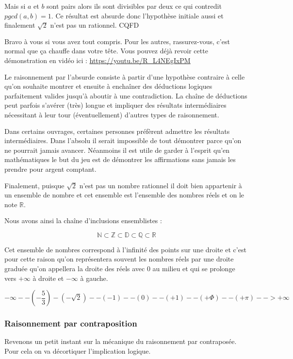 \documentclass[a4paper, 11pt, twoside]{article}
\newcommand{\R}{\mathbb{R}}
\newcommand{\E}[1]{\mathbb{#1}}
\begin{document}
Mais si \(a\) et \(b\) sont pairs alors ils sont divisibles par deux ce
qui contredit \(pgcd(a, b) = 1\). Ce résultat est absurde donc
l'hypothèse initiale aussi et finalement \(\sqrt{2}\) n'est pas un
rationnel. CQFD

Bravo à vous si vous avez tout compris. Pour les autres,
rassurez-vous, c'est normal que ça chauffe dans votre tête. Vous
pouvez déjà revoir cette démonstration en vidéo ici :
\url{https://youtu.be/R\_L4NEgIxPM}

Le raisonnement par l'absurde consiste à partir d'une hypothèse
contraire à celle qu'on souhaite montrer et ensuite à enchaîner des
déductions logiques parfaitement valides jusqu'à aboutir à une
contradiction. La chaîne de déductions peut parfois s'avérer (très)
longue et impliquer des résultats intermédiaires nécessitant à leur
tour (éventuellement) d'autres types de raisonnement.

Dans certains ouvrages, certaines personnes préfèrent admettre les
résultats intermédiaires. Dans l'absolu il serait impossible de
tout démontrer parce qu'on ne pourrait jamais avancer. Néanmoins il
est utile de garder à l'esprit qu'en mathématiques le but du jeu
est de démontrer les affirmations sans jamais les prendre pour
argent comptant.

Finalement, puisque \(\sqrt{2}\) n'est pas un nombre rationnel il
doit bien appartenir à un ensemble de nombre et cet ensemble est
l'ensemble des nombres réels et on le note \(\R\).

Nous avons ainsi la chaîne d'inclusions ensemblistes :

\[\E{N}\subset\E{Z}\subset\E{D}\subset\E{Q}\subset\R\]

Cet ensemble de nombres correspond à l'infinité des points sur une
droite et c'est pour cette raison qu'on représentera souvent les
nombres réels par une droite graduée qu'on appellera la droite des
réels avec 0 au milieu et qui se prolonge vers \(+\infty\) à droite
et \(-\infty\) à gauche.

\[-\infty --\left(-\frac{5}{3}\right)-(-\sqrt{2})--(-1)--(0)--(+1)--(+\Phi)--(+\pi)-->+\infty\]

\subsubsection{Raisonnement par contraposition}
\label{sec:org94fd512}

Revenons un petit instant sur la mécanique du raisonnement par
contraposée. Pour cela on va décortiquer l'implication logique.
\end{document}

